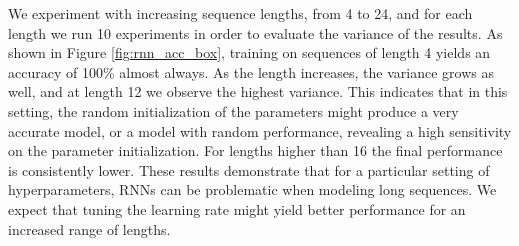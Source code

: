 \documentclass{article}
\begin{document}
We experiment with increasing sequence lengths, from 4 to 24, and for each length we run 10 experiments in order to evaluate the variance of the results. As shown in Figure \ref{fig:rnn_acc_box}, training on sequences of length 4 yields an accuracy of 100\% almost always. As the length increases, the variance grows as well, and at length 12 we observe the highest variance. This indicates that in this setting, the random initialization of the parameters might produce a very accurate model, or a model with random performance, revealing a high sensitivity on the parameter initialization. For lengths higher than 16 the final performance is consistently lower. These results demonstrate that for a particular setting of hyperparameters, RNNs can be problematic when modeling long sequences. We expect that tuning the learning rate might yield better performance for an increased range of lengths.
\end{document}
